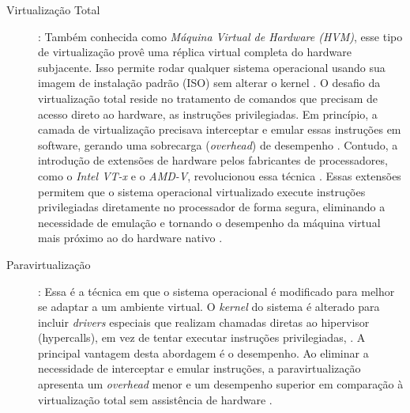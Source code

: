 \begin{description}
    \item[Virtualização Total]: Também conhecida como \textit{Máquina Virtual de Hardware (HVM)}, esse tipo de virtualização provê uma réplica virtual completa do hardware subjacente. Isso permite rodar qualquer sistema operacional usando sua imagem de instalação padrão (ISO) sem alterar o kernel \cite{carissimi2008}. O desafio da virtualização total reside no tratamento de comandos que precisam de acesso direto ao hardware, as instruções privilegiadas. Em princípio, a camada de virtualização precisava interceptar e emular essas instruções em software, gerando uma sobrecarga (\textit{overhead}) de desempenho \cite{carissimi2008}. Contudo, a introdução de extensões de hardware pelos fabricantes de processadores, como o \textit{Intel VT-x} e o \textit{AMD-V}, revolucionou essa técnica \cite{carissimi2008}. Essas extensões permitem que o sistema operacional virtualizado execute instruções privilegiadas diretamente no processador de forma segura, eliminando a necessidade de emulação e tornando o desempenho da máquina virtual mais próximo ao do hardware nativo \cite{chawla2025}.
    \item[Paravirtualização]: Essa é a técnica em que o sistema operacional é modificado para melhor se adaptar a um ambiente virtual. O \textit{kernel} do sistema é alterado para incluir \textit{drivers} especiais que realizam chamadas diretas ao hipervisor (hypercalls), em vez de tentar executar instruções privilegiadas, \cite{carissimi2008}. A principal vantagem desta abordagem é o desempenho. Ao eliminar a necessidade de interceptar e emular instruções, a paravirtualização apresenta um \textit{overhead} menor e um desempenho superior em comparação à virtualização total sem assistência de hardware \cite{carissimi2008}.
\end{description}

